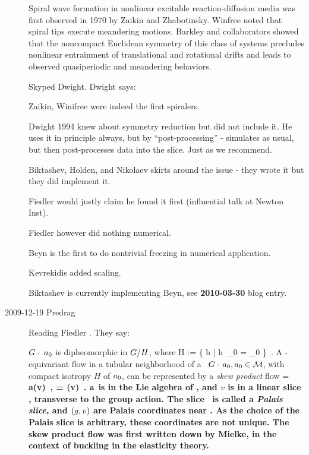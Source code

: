 \begin{description}
Spiral wave formation in nonlinear excitable reaction-diffusion media was
first observed in 1970 by Zaikin and Zhabotinsky.
Winfree noted that spiral tips execute
meandering motions.
Barkley and collaborators showed that the
noncompact Euclidean symmetry of this class of systems precludes
nonlinear entrainment of translational and rotational drifts and leads to
observed quasiperiodic and meandering behaviors.

Skyped Dwight.
Dwight says:

Zaikin, Winifree were indeed the first spiralers.

Dwight 1994 knew about symmetry reduction but did not
include it. He uses it in principle always, but by ``post-processing''
- simulates as usual, but then post-processes data into the slice.
Just as we recommend.

Biktashev, Holden, and Nikolaev
skirts around the issue - they wrote it
 but they did implement it.

{Fiedler} would justly claim he found it first (influential talk
at Newton Inst).

Fiedler \etal{} however did nothing numerical.

Beyn is the first to do nontrivial freezing in numerical
application.

Kevrekidis added scaling.

Biktashev is currently implementing Beyn, see {\bf 2010-03-30}
blog entry.

\item[2009-12-19 Predrag]
Reading Fiedler \etal{}. They say:

$G \cdot \ a_0$ is dipheomorphic in $G/H$,
where
\beq
H := \{ h \in \Group | h \,\ssp_0 = \ssp_0 \}
\,.
A \Group-equivariant flow in a tubular neighborhood of a
\reqv\ $G \cdot \,a_0, a_0 \in {\cal M}$,
with compact isotropy $H$ of $a_0$, can be represented
by a {\em skew product} flow
\beq
\dot{\LieEl} = \LieEl \, \bf{a}(v)
	\,,\qquad
{} = \phi(v)
\,.
$\bf{a}$ is in the Lie algebra of \Group, and $v$ is in a linear
slice \pSRed, transverse to the group action. The slice  \pSRed\
is called a {\em Palais slice}, and $(g,v)$ are Palais
coordinates near \reqv. As the choice of the Palais slice is
arbitrary, these coordinates are not unique. The skew product flow
\refeq{FiedlSkPr}  was first
written down by Mielke, in the context of buckling
in the elasticity theory.


\end{description}
